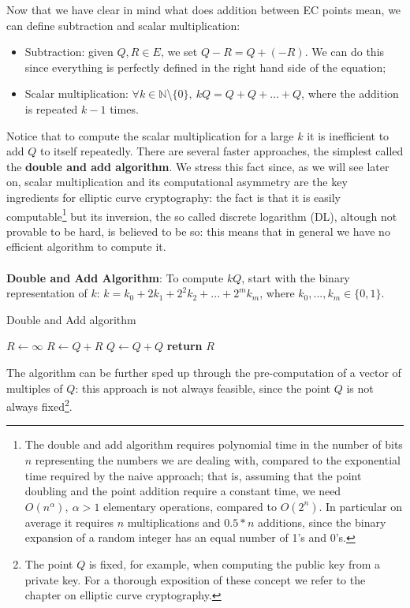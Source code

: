 \bigskip
\noindent
Now that we have clear in mind what does addition between EC points mean, we can define subtraction and scalar multiplication:
\begin{itemize}
	\item Subtraction: given $Q, R \in E$, we set $Q - R = Q + (-R)$. We can do this since everything is perfectly defined in the right hand side of the equation;
	\item Scalar multiplication: $\forall k \in \mathbb{N}$\textbackslash$\{0\}, \ kQ = Q + Q + ... + Q$, where the addition is repeated $k - 1$ times.
\end{itemize}
Notice that to compute the scalar multiplication for a large $k$ it is inefficient to add $Q$ to itself repeatedly. There are several faster approaches, the simplest called the {\bf double and add algorithm}. 
We stress this fact since, as we will see later on, scalar multiplication and its computational asymmetry are the key ingredients for elliptic curve cryptography: the fact is that it is easily computable\footnote{The double and add algorithm requires polynomial time in the number of bits $n$ representing the numbers we are dealing with, compared to the exponential time required by the naive approach; that is, assuming that the point doubling and the point addition require a constant time, we need $O(n^{\alpha}), \ \alpha > 1$ elementary operations, compared to $O(2^n)$. In particular on average it requires $n$ multiplications and $0.5 * n$  additions, since the binary expansion of a random integer has an equal number of 1’s and 0’s.}
but its inversion, the so called discrete logarithm (DL), altough not provable to be hard, is believed to be so: this means that in general we have no efficient algorithm to compute it.
\\
\\
{\bf Double and Add Algorithm}: To compute $kQ$, start with the binary representation of $k$: $k = k_0 + 2k_1 + 2^2k_2 + ... + 2^mk_m$, where $k_0,...,k_m \in \{0, 1\}$. 

\begin{algorithm}
	\caption{Double and Add algorithm}
	\label{alg:double_add}
	\begin{algorithmic}[1]
		\State $R \gets \infty$
		\State $R \gets Q + R$
		\EndIf
		\State $Q \gets Q + Q$
		\EndFor
		\State \textbf{return} $R$
		\EndProcedure
	\end{algorithmic}
\end{algorithm}
\noindent
The algorithm can be further sped up through the pre-computation of a vector of multiples of $Q$: this approach is not always feasible, since the point $Q$ is not always fixed\footnote{The point $Q$ is fixed, for example, when computing the public key from a private key. For a thorough exposition of these concept we refer to the chapter on elliptic curve cryptography.}.